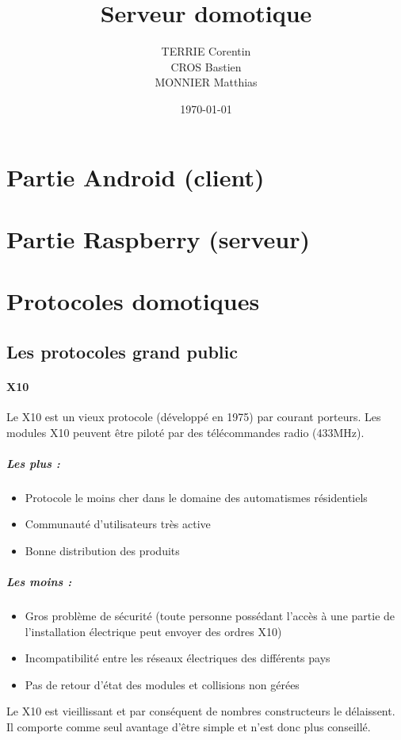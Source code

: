 \documentclass[a4paper,10pt]{article}
\title{Serveur domotique}
\author{TERRIE Corentin \\ CROS Bastien \\ MONNIER Matthias}
\date{\today}
\begin{document}

\tableofcontents
\clearpage



\section{Partie Android (client)}




\section{Partie Raspberry (serveur)}




\section{Protocoles domotiques}

\subsection{Les protocoles grand public}
\paragraph{X10}
Le X10 est un vieux protocole (développé en 1975) par courant porteurs.  Les modules X10 peuvent être piloté par des télécommandes radio (433MHz). 

\subparagraph{Les plus :}
\begin{itemize}
\item Protocole le moins cher dans le domaine des automatismes résidentiels
\item Communauté d'utilisateurs très active
\item Bonne distribution des produits
\end{itemize}
\subparagraph{Les moins :}
\begin{itemize}
\item Gros problème de sécurité (toute personne possédant l'accès à une partie de l'installation électrique peut envoyer des ordres X10)
\item Incompatibilité entre les réseaux électriques des différents pays
\item Pas de retour d'état des modules et collisions non gérées
\end{itemize}
Le X10 est vieillissant et par conséquent de nombres constructeurs le délaissent. Il comporte comme seul avantage d'être simple et n'est donc plus conseillé.
\end{document}
